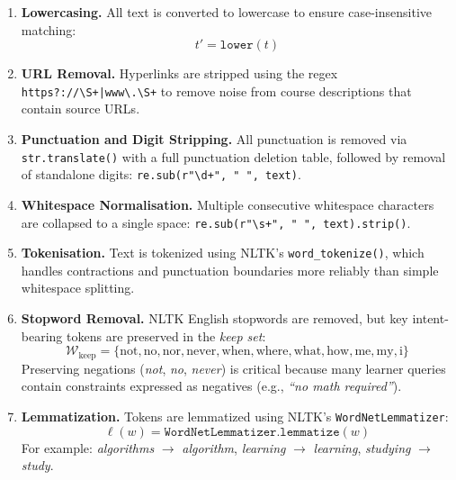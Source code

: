 \documentclass[12pt, a4paper]{article}
\begin{document}
\begin{enumerate}[leftmargin=*, label=\textbf{Stage \arabic*:}]
    \item \textbf{Lowercasing.} All text is converted to lowercase to ensure case-insensitive matching:
    \begin{equation}
        t' = \texttt{lower}(t)
        \label{eq:lower}
    \end{equation}
    
    \item \textbf{URL Removal.} Hyperlinks are stripped using the regex
    \texttt{https?://\textbackslash S+|www\textbackslash.\textbackslash S+} to remove noise from
    course descriptions that contain source URLs.
    
    \item \textbf{Punctuation and Digit Stripping.} All punctuation is removed via
    \texttt{str.translate()} with a full punctuation deletion table, followed by removal of
    standalone digits: \texttt{re.sub(r"\textbackslash d+", " ", text)}.
    
    \item \textbf{Whitespace Normalisation.} Multiple consecutive whitespace characters are
    collapsed to a single space: \texttt{re.sub(r"\textbackslash s+", " ", text).strip()}.
    
    \item \textbf{Tokenisation.} Text is tokenized using NLTK's \texttt{word\_tokenize()}, which
    handles contractions and punctuation boundaries more reliably than simple whitespace splitting.
    
    \item \textbf{Stopword Removal.} NLTK English stopwords are removed, but key intent-bearing
    tokens are preserved in the \textit{keep set}:
    \begin{equation}
        \mathcal{W}_{\text{keep}} = \{\text{not}, \text{no}, \text{nor}, \text{never},
        \text{when}, \text{where}, \text{what}, \text{how}, \text{me}, \text{my}, \text{i}\}
        \label{eq:keepset}
    \end{equation}
    Preserving negations (\textit{not}, \textit{no}, \textit{never}) is critical because many
    learner queries contain constraints expressed as negatives (e.g., \textit{``no math required''}).
    
    \item \textbf{Lemmatization.} Tokens are lemmatized using NLTK's \texttt{WordNetLemmatizer}:
    \begin{equation}
        \ell(w) = \texttt{WordNetLemmatizer.lemmatize}(w)
        \label{eq:lemma}
    \end{equation}
    For example: \textit{algorithms} $\to$ \textit{algorithm}, \textit{learning} $\to$
    \textit{learning}, \textit{studying} $\to$ \textit{study}.
\end{enumerate}
\end{document}
